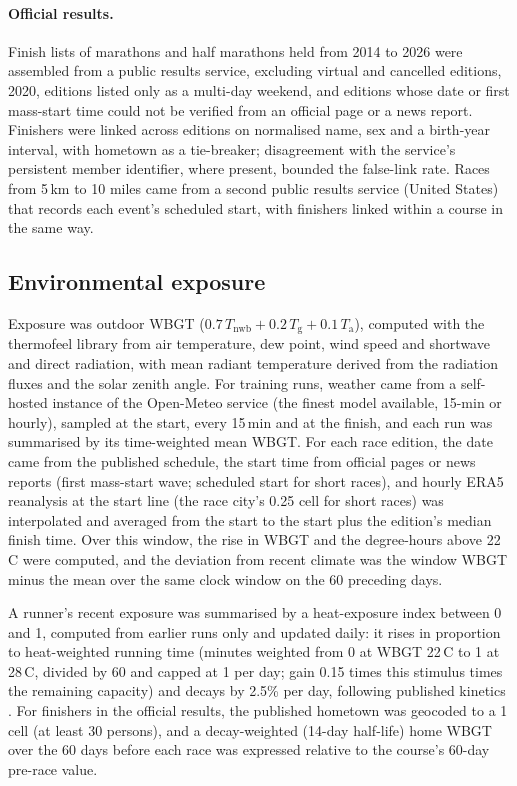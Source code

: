 \documentclass[12pt]{article}
\newcommand{\degC}{\,\textdegree C}
\begin{document}
\paragraph{Official results.} Finish lists of marathons and half marathons held from 2014 to 2026 were assembled from a public results service, excluding virtual and cancelled editions, 2020, editions listed only as a multi-day weekend, and editions whose date or first mass-start time could not be verified from an official page or a news report. Finishers were linked across editions on normalised name, sex and a birth-year interval, with hometown as a tie-breaker; disagreement with the service's persistent member identifier, where present, bounded the false-link rate. Races from 5\,km to 10 miles came from a second public results service (United States) that records each event's scheduled start, with finishers linked within a course in the same way.

\subsection{Environmental exposure}
Exposure was outdoor WBGT ($0.7\,T_{\mathrm{nwb}} + 0.2\,T_{\mathrm{g}} + 0.1\,T_{\mathrm{a}}$), computed with the thermofeel library \cite{brimicombe2022} from air temperature, dew point, wind speed and shortwave and direct radiation, with mean radiant temperature derived from the radiation fluxes and the solar zenith angle. For training runs, weather came from a self-hosted instance of the Open-Meteo service \cite{zippenfenig2023} (the finest model available, 15-min or hourly), sampled at the start, every 15\,min and at the finish, and each run was summarised by its time-weighted mean WBGT. For each race edition, the date came from the published schedule, the start time from official pages or news reports (first mass-start wave; scheduled start for short races), and hourly ERA5 reanalysis \cite{hersbach2020} at the start line (the race city's 0.25\textdegree{} cell for short races) was interpolated and averaged from the start to the start plus the edition's median finish time. Over this window, the rise in WBGT and the degree-hours above 22\degC{} were computed, and the deviation from recent climate was the window WBGT minus the mean over the same clock window on the 60 preceding days.

A runner's recent exposure was summarised by a heat-exposure index between 0 and 1, computed from earlier runs only and updated daily: it rises in proportion to heat-weighted running time (minutes weighted from 0 at WBGT 22\degC{} to 1 at 28\degC, divided by 60 and capped at 1 per day; gain 0.15 times this stimulus times the remaining capacity) and decays by 2.5\% per day, following published kinetics \cite{racinais2015,daanen2018art}. For finishers in the official results, the published hometown was geocoded to a 1\textdegree{} cell (at least 30 persons), and a decay-weighted (14-day half-life) home WBGT over the 60 days before each race was expressed relative to the course's 60-day pre-race value.
\end{document}
